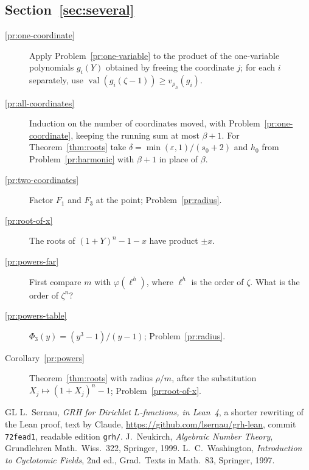 \documentclass[reqno]{amsart}
\theoremstyle{definition}
\theoremstyle{plain}
\newcommand{\val}{\operatorname{val}}
\begin{document}
\subsection*{Section~\ref{sec:several}}
\begin{description}
\item[\ref{pr:one-coordinate}] Apply Problem~\ref{pr:one-variable} to the product of the one-variable polynomials \(g_i(Y)\) obtained by freeing the coordinate \(j\); for each \(i\) separately, use \(\val(g_i(\zeta - 1)) \ge v_{\rho_h}(g_i)\).
\item[\ref{pr:all-coordinates}] Induction on the number of coordinates moved, with Problem~\ref{pr:one-coordinate}, keeping the running sum at most \(\beta + 1\).  For Theorem~\ref{thm:roots} take \(\delta = \min(\varepsilon, 1)/(s_0 + 2)\) and \(h_0\) from Problem~\ref{pr:harmonic} with \(\beta + 1\) in place of \(\beta\).
\item[\ref{pr:two-coordinates}] Factor \(F_1\) and \(F_3\) at the point; Problem~\ref{pr:radius}.
\item[\ref{pr:root-of-x}] The roots of \((1 + Y)^n - 1 - x\) have product \(\pm x\).
\item[\ref{pr:powers-far}] First compare \(m\) with \(\varphi(\ell^h)\), where \(\ell^h\) is the order of \(\zeta\).  What is the order of \(\zeta^n\)?
\item[\ref{pr:powers-table}] \(\Phi_3(y) = (y^3 - 1)/(y - 1)\); Problem~\ref{pr:radius}.
\item[Corollary~\ref{pr:powers}] Theorem~\ref{thm:roots} with radius \(\rho/m\), after the substitution \(X_j \mapsto (1 + X_j)^n - 1\); Problem~\ref{pr:root-of-x}.
\end{description}

\begin{thebibliography}{GL}
 L.~Sernau, \emph{GRH for Dirichlet \(L\)-functions, in Lean~4}, a shorter rewriting of the Lean proof, text by Claude, \url{https://github.com/lsernau/grh-lean}, commit \texttt{72fead1}, readable edition \texttt{grh/}.
 J.~Neukirch, \emph{Algebraic Number Theory}, Grundlehren Math.\ Wiss.\ 322, Springer, 1999.
 L.~C.~Washington, \emph{Introduction to Cyclotomic Fields}, 2nd ed., Grad.\ Texts in Math.\ 83, Springer, 1997.
\end{thebibliography}
\end{document}
